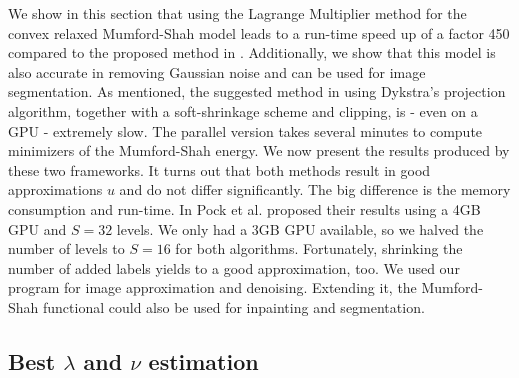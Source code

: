 \documentclass[abstracton]{scrreprt}
\begin{document}
        We show in this section that using the Lagrange Multiplier method for the convex relaxed Mumford-Shah model leads to a run-time speed up of a factor 450 compared to the proposed method in \cite{Pock-et-al-iccv09}. Additionally, we show that this model is also accurate in removing Gaussian noise and can be used for image segmentation. As mentioned, the suggested method in \cite{Pock-et-al-iccv09} using Dykstra's projection algorithm, together with a soft-shrinkage scheme and clipping, is - even on a GPU - extremely slow. The parallel version takes several minutes to compute minimizers of the Mumford-Shah energy. We now present the results produced by these two frameworks. It turns out that both methods result in good approximations $u$ and do not differ significantly. The big difference is the memory consumption and run-time. In \cite{Pock-et-al-iccv09} Pock et al. proposed their results using a 4GB GPU and $S = 32$ levels. We only had a 3GB GPU available, so we halved the number of levels to $S = 16$ for both algorithms. Fortunately, shrinking the number of added labels yields to a good approximation, too. We used our program for image approximation and denoising. Extending it, the Mumford-Shah functional could also be used for inpainting and segmentation.

        \subsection{Best $\lambda$ and $\nu$ estimation} %
        \label{sub:best_lambda_and_nu_estimation}
\end{document}
